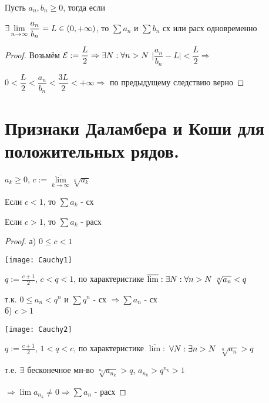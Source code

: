 \documentclass[11pt, fleqn]{article}
\begin{document}
\begin{Property}[3]
\begin{Property}[4]
\begin{Property}[2, аддитивность]
\begin{consequence} 
    Пусть $a_n, b_n \geqslant 0$, тогда если 
    
    $\exists \lim\limits_{n \rightarrow \infty} \dfrac{a_n}{b_n} = L \in (0, + \infty)$, то $\sum a_n$ и $\sum b_n$ сх или расх одновременно
\end{consequence}

\begin{proof}
    Возьмём $\mathcal{E}:=\dfrac{L}{2} \Rightarrow \exists N: \forall n > N$ $\big|\dfrac{a_n}{b_n} - L\big| < \dfrac{L}{2} \Rightarrow$
    
    $0 < \dfrac{L}{2} < \dfrac{a_n}{b_n} < \dfrac{3L}{2} < +\infty \Rightarrow$ по предыдущему следствию верно
\end{proof}

\newpage
\section{Признаки Даламбера и Коши для положительных рядов.}
 
\begin{theorem} 
    $a_k \geqslant 0$, $c:=\overline{\lim\limits_{k \rightarrow \infty}} \sqrt[k]{a_k}$
    
    Если $c < 1$, то $\sum a_k$ - сх
    
    Если $c > 1$, то $\sum a_k$ - расх
\end{theorem}

\begin{proof}
    
    а) $0 \leqslant c < 1$
    
    \texttt{[image: Cauchy1]}
    
    $q := \frac{c+1}{2}$, $c<q<1$, по характеристике $\overline{\lim}: \exists N: \forall n > N\ \sqrt[n]{a_n} < q$
    
    т.к. $0 \leqslant a_n < q^n$ и $\sum q^n$ - сх $\Rightarrow \sum a_n$ - сх
    \\
    б) $c > 1$
    
    \texttt{[image: Cauchy2]}
    
    $q := \frac{c+1}{2}$, $1<q<c$, по характеристике $\overline{\lim}:$ $\forall N: \exists n > N$ $\sqrt[n]{a_n} > q$
    
    т.е. $\exists$ бесконечное мн-во $\sqrt[n_k]{a_{n_k}} > q$, $a_{n_k} > q^{n_k} > 1$
    
    $\Rightarrow \lim a_{n_k} \neq 0 \Rightarrow \sum a_n$ - расх
\end{proof}


\end{Property}
\end{Property}
\end{Property}
\end{document}

